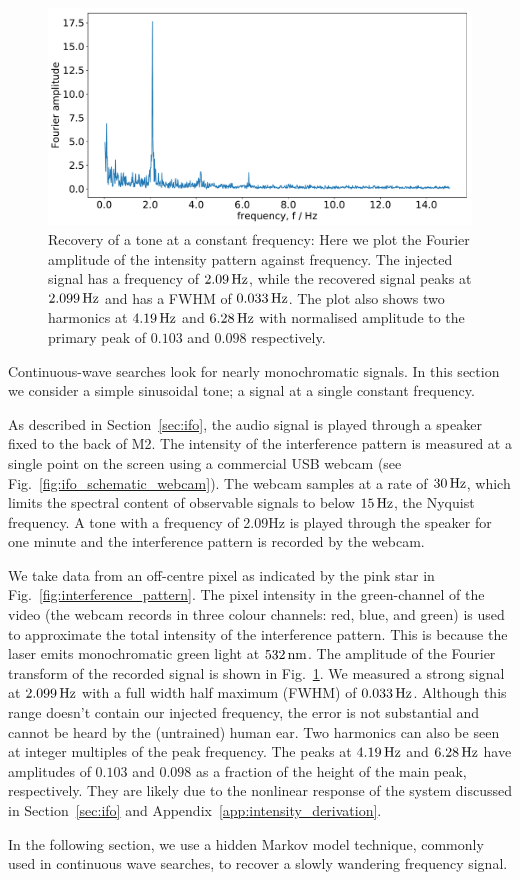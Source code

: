 \documentclass[paper-main.tex]{subfiles}
\begin{document}
\begin{figure}
	\includegraphics[width=.49\textwidth]{figures/webcam_expt_4_0209-cropped.pdf}
	\caption{\label{fig:webcam_spectrum}
Recovery of a tone at a constant frequency: Here we plot the Fourier amplitude of the intensity pattern against frequency.
The injected signal has a frequency of $2.09\,{\rm Hz}$, while the recovered signal peaks at $2.099\,{\rm Hz}$ and has a FWHM of $0.033\,{\rm Hz}$.
The plot also shows two harmonics at $4.19\,{\rm Hz}$ and $6.28\,{\rm Hz}$ with normalised amplitude to the primary peak of $0.103$ and $0.098$ respectively.
}	
\end{figure}


Continuous-wave searches look for nearly monochromatic signals. In this section we consider a simple sinusoidal tone; a signal at a single constant frequency.

As described in Section~\ref{sec:ifo}, the audio signal is played through a speaker fixed to the back of M2. The intensity of the interference pattern is measured at a single point on the screen using a commercial USB webcam (see Fig.~\ref{fig:ifo_schematic_webcam}). The webcam samples at a rate of $30\,{\rm Hz}$, which limits the spectral content of observable signals to below $15\,{\rm Hz}$, the Nyquist frequency. A tone with a frequency of 2.09Hz is played through the speaker for one minute and the interference pattern is recorded by the webcam.


We take data from an off-centre pixel as indicated by the pink star in Fig.~\ref{fig:interference_pattern}. The pixel intensity in the green-channel of the video (the webcam records in three colour channels: red, blue, and green) is used to approximate the total intensity of the interference pattern. This is because the laser emits monochromatic green light at $532\,{\rm nm}$.
The amplitude of the Fourier transform of the recorded signal is shown in Fig.~\ref{fig:webcam_spectrum}. We measured a strong signal at $2.099\,{\rm Hz}$ with a full width half maximum (FWHM) of $0.033\,{\rm Hz}$. Although this range doesn't contain our injected frequency, the error is not substantial and cannot be heard by the (untrained) human ear.
Two harmonics can also be seen at integer multiples of the peak frequency. The peaks at $4.19\,{\rm Hz}$ and $6.28\,{\rm Hz}$ have amplitudes of $0.103$ and $0.098$ as a fraction of the height of the main peak, respectively. They are likely due to the nonlinear response of the system discussed in Section~\ref{sec:ifo} and Appendix~\ref{app:intensity_derivation}.


In the following section, we use a hidden Markov model technique, commonly used in continuous wave searches, to recover a slowly wandering frequency signal.
\end{document}
